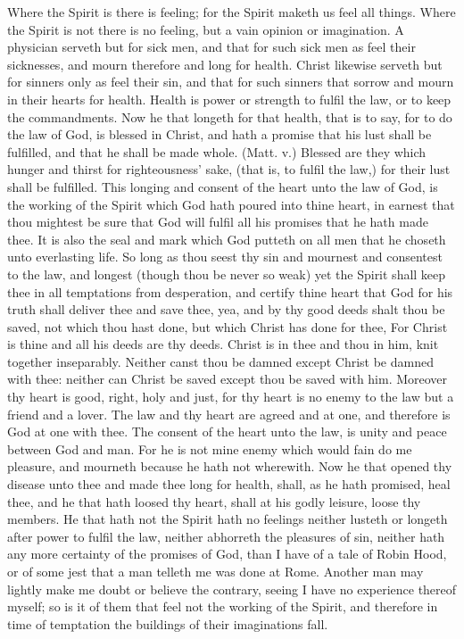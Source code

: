 Where the Spirit is there is feeling; for the Spirit maketh 
us feel all things. Where the Spirit is not there is no feeling,
but a vain opinion or imagination. A physician serveth
but for sick men, and that for such sick men as feel their
sicknesses, and mourn therefore and long for health.
Christ likewise serveth but for sinners only as feel their sin, 
and that for such sinners that sorrow and mourn in their 
hearts for health. Health is power or strength to fulfil the 
law, or to keep the commandments. Now he that longeth 
for that health, that is to say, for to do the law of God, is 
blessed in Christ, and hath a promise that his lust shall be 
fulfilled, and that he shall be made whole. (Matt. v.) 
Blessed are they which hunger and thirst for righteousness' 
sake, (that is, to fulfil the law,) for their lust shall be fulfilled. 
This longing and consent of the heart unto the law of God, 
is the working of the Spirit which God hath poured into 
thine heart, in earnest that thou mightest be sure that God 
will fulfil all his promises that he hath made thee. It is 
also the seal and mark which God putteth on all men 
that he choseth unto everlasting life. So long as thou 
seest thy sin and mournest and consentest to the law, and 
longest (though thou be never so weak) yet the Spirit shall 
keep thee in all temptations from desperation, and certify 
thine heart that God for his truth shall deliver thee and save 
thee, yea, and by thy good deeds shalt thou be saved, not 
which thou hast done, but which Christ has done for thee, 
For Christ is thine and all his deeds are thy deeds. Christ 
is in thee and thou in him, knit together inseparably. Neither 
canst thou be damned except Christ be damned with thee: 
neither can Christ be saved except thou be saved with him. 
Moreover thy heart is good, right, holy and just, for thy 
heart is no enemy to the law but a friend and a lover. The 
law and thy heart are agreed and at one, and therefore is God 
at one with thee. The consent of the heart unto the law, 
is unity and peace between God and man. For he is not 
mine enemy which would fain do me pleasure, and mourneth 
because he hath not wherewith. Now he that opened thy 
disease unto thee and made thee long for health, shall, as 
he hath promised, heal thee, and he that hath loosed thy 
heart, shall at his godly leisure, loose thy members. He 
that hath not the Spirit hath no feelings neither lusteth or 
longeth after power to fulfil the law, neither abhorreth the 
pleasures of sin, neither hath any more certainty of the promises
of God, than I have of a tale of Robin Hood, or 
of some jest that a man telleth me was done at Rome. 
Another man may lightly make me doubt or believe the 
contrary, seeing I have no experience thereof myself; so is it 
of them that feel not the working of the Spirit, and therefore 
in time of temptation the buildings of their imaginations fall. 

